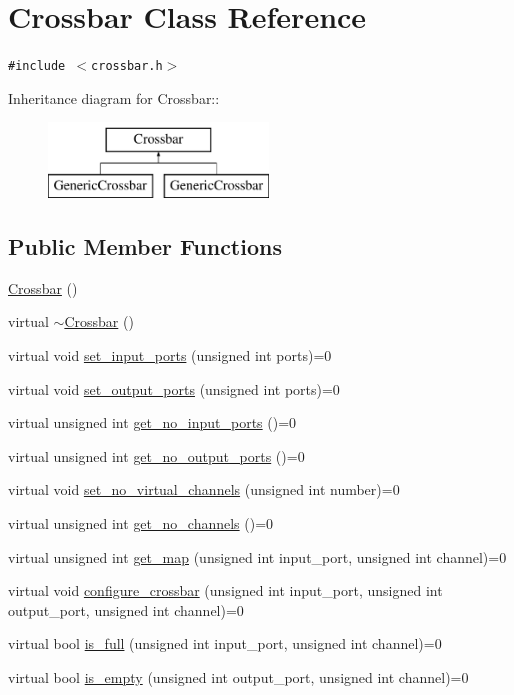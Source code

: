 \hypertarget{classCrossbar}{
\section{Crossbar Class Reference}
\label{classCrossbar}
}
{\tt \#include $<$crossbar.h$>$}

Inheritance diagram for Crossbar::\begin{figure}[H]
\begin{center}
\leavevmode
\includegraphics[height=2cm]{classCrossbar}
\end{center}
\end{figure}
\subsection*{Public Member Functions}
\begin{CompactItemize}
\item 
\hyperlink{classCrossbar_4093a8bf3894e372d4fa9ce06f2abf3d}{Crossbar} ()
\item 
virtual \hyperlink{classCrossbar_7debf5ed12155b31a21b13fff53357a6}{$\sim$Crossbar} ()
\item 
virtual void \hyperlink{classCrossbar_3223fa48d2c281d62747e4c10a14e1ba}{set\_\-input\_\-ports} (unsigned int ports)=0
\item 
virtual void \hyperlink{classCrossbar_291346aae5dfeee7ef946ee3addc3877}{set\_\-output\_\-ports} (unsigned int ports)=0
\item 
virtual unsigned int \hyperlink{classCrossbar_ec960231980043c3669add726b239e50}{get\_\-no\_\-input\_\-ports} ()=0
\item 
virtual unsigned int \hyperlink{classCrossbar_fa381d5e1af2576a2aaa5fb392072918}{get\_\-no\_\-output\_\-ports} ()=0
\item 
virtual void \hyperlink{classCrossbar_e7da6eea8ab565f26513dfe52d1516f5}{set\_\-no\_\-virtual\_\-channels} (unsigned int number)=0
\item 
virtual unsigned int \hyperlink{classCrossbar_a8e1c2a18960f4e6b9c076246239b092}{get\_\-no\_\-channels} ()=0
\item 
virtual unsigned int \hyperlink{classCrossbar_b7a6eee3263359c40f24dde01decfa20}{get\_\-map} (unsigned int input\_\-port, unsigned int channel)=0
\item 
virtual void \hyperlink{classCrossbar_8a7a059788ee336f171eb1d3c7be3110}{configure\_\-crossbar} (unsigned int input\_\-port, unsigned int output\_\-port, unsigned int channel)=0
\item 
virtual bool \hyperlink{classCrossbar_350fd72418bcb525209ae9e10c834468}{is\_\-full} (unsigned int input\_\-port, unsigned int channel)=0
\item 
virtual bool \hyperlink{classCrossbar_dc95dc76ac1c9f02a80ce7ada4559ce3}{is\_\-empty} (unsigned int output\_\-port, unsigned int channel)=0
\end{CompactItemize}


